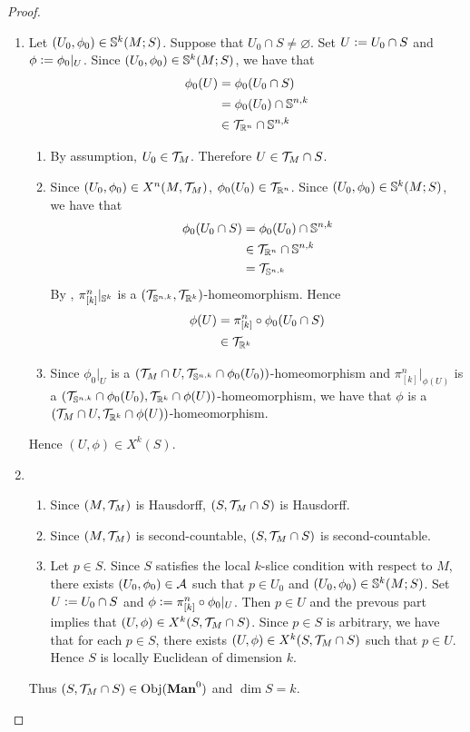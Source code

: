 \documentclass{book}
\begin{document}
	\begin{proof}\
		\begin{enumerate}
			\item 
			Let $(U_0, \phi_0) \in \S^k(M; S)$. Suppose that $U_0 \cap S \neq \varnothing$. Set $U \defeq U_0 \cap S$ and $\phi \defeq \phi_0|_U$. Since $(U_0, \phi_0) \in \S^k(M; S)$, we have that 
			\begin{align*}
				\phi_0(U)
				& = \phi_0(U_0 \cap S) \\
				& = \phi_0(U_0) \cap \S^{n,k} \\
				& \in \MT_{\R^n} \cap \S^{n,k}
			\end{align*}
			\begin{enumerate}
				\item By assumption, $U_0 \in \MT_M$. Therefore $U \in \MT_M \cap S$.
				\item Since $(U_0, \phi_0) \in X^n(M, \MT_M)$, $\phi_0(U_0) \in \MT_{\R^n}$. Since $(U_0, \phi_0) \in \S^k(M; S)$, we have that 
				\begin{align*}
					\phi_0(U_0 \cap S) 
					& = \phi_0(U_0) \cap \S^{n,k} \\
					& \in \MT_{\R^n} \cap \S^{n,k} \\
					& = \MT_{\S^{n,k}}
				\end{align*}
				By , $\pi^n_{[k]}|_{\S^k}$ is a $(\MT_{\S^{n,k}}, \MT_{\R^k})$-homeomorphism. Hence 
				\begin{align*}
					\phi(U)
					& = \pi^n_{[k]} \circ \phi_0 (U_0 \cap S) \\
					& \in \MT_{\R^k}
				\end{align*}
				\item Since $\phi_0|_U$ is a $(\MT_M \cap U, \MT_{\S^{n,k}} \cap \phi_0(U_0))$-homeomorphism and $\pi^n_{[k]}|_{\phi(U)}$ is a $(\MT_{\S^{n,k}} \cap \phi_0(U_0), \MT_{\R^k} \cap \phi(U))$-homeomorphism, we have that $\phi$ is a $(\MT_M \cap U, \MT_{\R^k} \cap \phi(U))$-homeomorphism. 
			\end{enumerate}
			Hence $(U, \phi) \in X^k(S)$.
			\item 
			\begin{enumerate}
				\item Since $(M, \MT_M)$ is Hausdorff, $(S, \MT_M \cap S)$ is Hausdorff.
				\item Since $(M, \MT_M)$ is second-countable, $(S, \MT_M \cap S)$ is second-countable.
				\item Let $p \in S$. Since $S$ satisfies the local $k$-slice condition with respect to $M$, there exists $(U_0, \phi_0) \in \MA$ such that $p \in U_0$ and $(U_0, \phi_0) \in \S^k(M; S)$. Set $U \defeq U_0 \cap S$ and $\phi \defeq \pi^n_{[k]} \circ \phi_0|_U$. Then $p \in U$ and the prevous part implies that $(U, \phi) \in X^k(S, \MT_M \cap S)$. Since $p \in S$ is arbitrary, we have that for each $p \in S$, there exists $(U, \phi) \in X^k(S, \MT_M \cap S)$ such that $p \in U$. Hence $S$ is locally Euclidean of dimension $k$. 
			\end{enumerate}
			Thus $(S, \MT_M \cap S) \in \Obj(\Man0)$ and $\dim S = k$.
		\end{enumerate}
	\end{proof}
\end{document}
